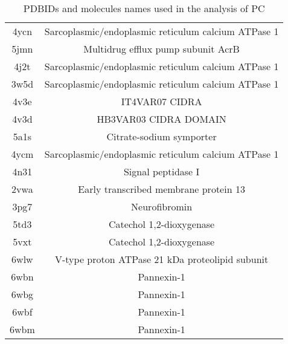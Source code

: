 \documentclass{article}
\begin{document}
\begin{table}[]
\begin{tabular}{c|c}
4ycn & Sarcoplasmic/endoplasmic reticulum calcium ATPase 1 \\ 
5jmn & Multidrug efflux pump subunit AcrB \\ 
4j2t & Sarcoplasmic/endoplasmic reticulum calcium ATPase 1 \\ 
3w5d & Sarcoplasmic/endoplasmic reticulum calcium ATPase 1 \\ 
4v3e & IT4VAR07 CIDRA \\ 
4v3d & HB3VAR03 CIDRA DOMAIN \\ 
5a1s & Citrate-sodium symporter \\ 
4ycm & Sarcoplasmic/endoplasmic reticulum calcium ATPase 1 \\ 
4n31 & Signal peptidase I \\ 
2vwa & Early transcribed membrane protein 13 \\ 
3pg7 & Neurofibromin \\ 
5td3 & Catechol 1,2-dioxygenase \\ 
5vxt & Catechol 1,2-dioxygenase \\ 
6wlw & V-type proton ATPase 21 kDa proteolipid subunit \\ 
6wbn & Pannexin-1 \\ 
6wbg & Pannexin-1 \\ 
6wbf & Pannexin-1 \\ 
6wbm & Pannexin-1 \\ 
    \end{tabular}
    \caption{PDBIDs and molecules names used in the analysis of PC}
    \label{tab:my_label}
\end{table}
\end{document}
